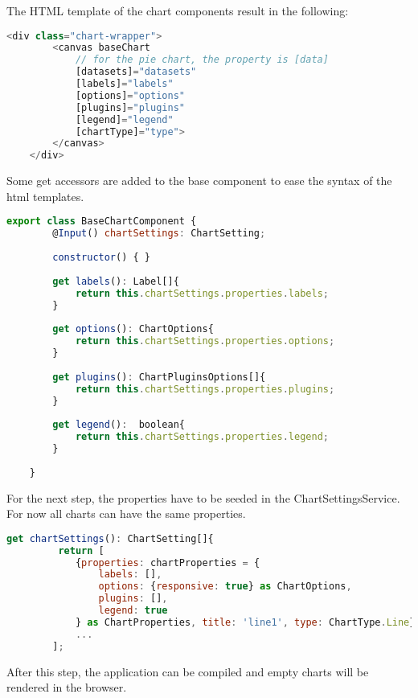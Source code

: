 The HTML template of the chart components result in the following:

\begin{lstlisting}[language=JavaScript] 	
	<div class="chart-wrapper">
		<canvas baseChart 
			// for the pie chart, the property is [data]
			[datasets]="datasets"
			[labels]="labels"
			[options]="options"
			[plugins]="plugins"
			[legend]="legend"
			[chartType]="type">
		</canvas>
	</div>
\end{lstlisting}

Some get accessors are added to the base component to ease the syntax of the html templates.

\begin{lstlisting}[language=JavaScript]
	export class BaseChartComponent {
		@Input() chartSettings: ChartSetting;
		
		constructor() { }
		
		get labels(): Label[]{
			return this.chartSettings.properties.labels;
		}
		
		get options(): ChartOptions{
			return this.chartSettings.properties.options;
		}
		
		get plugins(): ChartPluginsOptions[]{
			return this.chartSettings.properties.plugins;
		}
		
		get legend():  boolean{
			return this.chartSettings.properties.legend;
		}
		
	}
\end{lstlisting}

For the next step, the properties have to be seeded in the ChartSettingsService. For now all charts can have the same properties.

\begin{lstlisting}[language=JavaScript]
	get chartSettings(): ChartSetting[]{
		 return [
			{properties: chartProperties = {
				labels: [],
				options: {responsive: true} as ChartOptions,
				plugins: [],
				legend: true
			} as ChartProperties, title: 'line1', type: ChartType.Line},
			...
		];
\end{lstlisting}

After this step, the application can be compiled and empty charts will be rendered in the browser.






